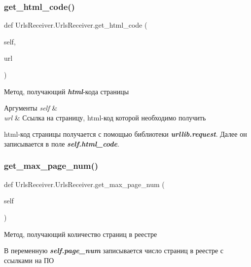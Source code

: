 \subsubsection{\texorpdfstring{get\+\_\+html\+\_\+code()}{get\_html\_code()}}
{\footnotesize\ttfamily def Urls\+Receiver.\+Urls\+Receiver.\+get\+\_\+html\+\_\+code (\begin{DoxyParamCaption}\item[{}]{self,  }\item[{}]{url }\end{DoxyParamCaption})}



Метод, получающий {\itshape {\bfseries html}}-\/кода страницы 


\begin{DoxyParams}{Аргументы}
{\em self} & \\
\hline
{\em url} & Ссылка на страницу, html-\/код которой необходимо получить\\
\hline
\end{DoxyParams}
html-\/код страницы получается с помощью библиотеки {\itshape {\bfseries urllib.\+request}}. Далее он записывается в поле {\itshape {\bfseries self.\+html\+\_\+code}}. \mbox{\label{classUrlsReceiver_1_1UrlsReceiver_a871a6b2bc7d65cd8ea6184061f994592}} 
\subsubsection{\texorpdfstring{get\+\_\+max\+\_\+page\+\_\+num()}{get\_max\_page\_num()}}
{\footnotesize\ttfamily def Urls\+Receiver.\+Urls\+Receiver.\+get\+\_\+max\+\_\+page\+\_\+num (\begin{DoxyParamCaption}\item[{}]{self }\end{DoxyParamCaption})}



Метод, получающий количество страниц в реестре 

В переменную {\itshape {\bfseries self.\+page\+\_\+num}} записывается число страниц в реестре с ссылками на ПО \mbox{\label{classUrlsReceiver_1_1UrlsReceiver_ace2cdcb9a1bb117d80ec0efad2b2374b}} 
